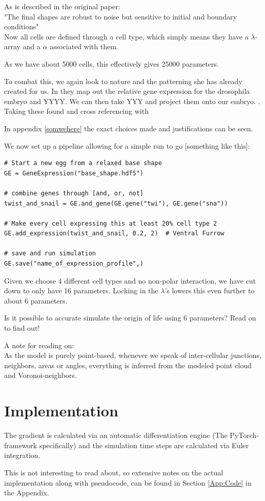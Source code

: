 As is described in the original paper:\\ 
"The final shapes are robust to noise but sensitive to initial and
boundary conditions"\\




Now all cells are defined through a cell type, which simply means they have a $\lambda$-array and a $\alpha$ associated with them.

As we have about 5000 cells, this effectively gives 25000 parameters.

To combat this, we again look to nature and the patterning she has already created for us. In \cite{shinyDVEX} they map out the relative gene expression for the drosophila embryo and YYYY. We can then take YYY and project them onto our embryo. . Taking these found and cross referencing with 

In appendix \ref{somwehere} the exact choices made and justifications can be seen.

We now set up a pipeline allowing for a simple run to go [something like this]:

\begin{lstlisting}
# Start a new egg from a relaxed base shape
GE = GeneExpression("base_shape.hdf5")

# combine genes through [and, or, not]
twist_and_snail = GE.and_gene(GE.gene("twi"), GE.gene("sna"))

# Make every cell expressing this at least 20% cell type 2 
GE.add_expression(twist_and_snail, 0.2, 2)  # Ventral Furrow

# save and run simulation
GE.save("name_of_expression_profile",)

\end{lstlisting}

Given we choose 4 different cell types and no non-polar interaction, we have cut down to only have 16 parameters. Locking in the $\lambda$'s lowers this even further to about 6 parameters. 

Is it possible to accurate simulate the origin of life using 6 parameters? Read on to find out!

A note for reading on:\\
As the model is purely point-based, whenever we speak of inter-cellular junctions, neighbors, areas or angles, everything is inferred from the modeled point cloud and Voronoi-neighbors.

\section{Implementation}
The gradient is calculated via an automatic differentiation engine (The PyTorch-framework specifically) and the simulation time steps are calculated via Euler integration.

This is not interesting to read about, so extensive notes on the actual implementation along with pseudocode, can be found in Section \ref{App:Code} in the Appendix.

